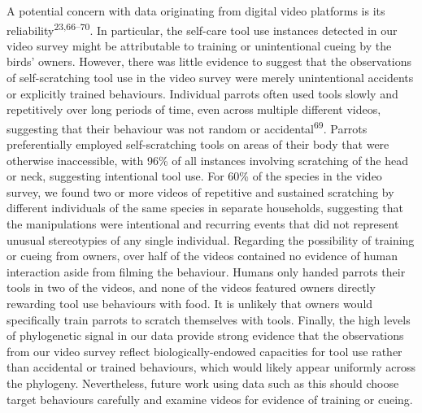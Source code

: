 \documentclass[
  man, donotrepeattitle,floatsintext]{apa6}
\begin{document}
A potential concern with data originating from digital video platforms is its
reliability\textsuperscript{23,66--70}.
In particular, the self-care tool use instances detected in our video survey
might be attributable to training or unintentional cueing by the birds' owners.
However, there was little evidence to suggest that the observations of
self-scratching tool use in the video survey were merely unintentional accidents
or explicitly trained behaviours. Individual parrots often used tools slowly and
repetitively over long periods of time, even across multiple different videos,
suggesting that their behaviour was not random or accidental\textsuperscript{69}.
Parrots preferentially employed self-scratching tools on areas of their body
that were otherwise inaccessible, with 96\% of all instances involving scratching
of the head or neck, suggesting intentional tool use. For 60\% of the species in
the video survey, we found two or more videos of repetitive and sustained
scratching by different individuals of the same species in separate households,
suggesting that the manipulations were intentional and recurring events that did
not represent unusual stereotypies of any single individual. Regarding the
possibility of training or cueing from owners, over half of the videos contained
no evidence of human interaction aside from filming the behaviour. Humans only
handed parrots their tools in two of the videos, and none of the videos featured
owners directly rewarding tool use behaviours with food. It is unlikely that
owners would specifically train parrots to scratch themselves with tools.
Finally, the high levels of phylogenetic signal in our data provide strong
evidence that the observations from our video survey reflect
biologically-endowed capacities for tool use rather than accidental or trained
behaviours, which would likely appear uniformly across the phylogeny.
Nevertheless, future work using data such as this should choose target
behaviours carefully and examine videos for evidence of training or cueing.
\end{document}
